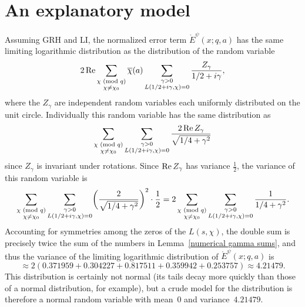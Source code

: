 \documentclass[11pt]{article}
\theoremstyle{plain}
\theoremstyle{definition}
\numberwithin{equation}{section}
\renewcommand{\mod}[1]{{\ifmmode\text{\rm\ (mod~$#1$)}\else\discretionary{}{}{\hbox{\!\!}}\rm(mod~$#1$)\fi}}
\renewcommand{\Re}{\mathop{\rm Re}}
\renewcommand{\bar}{\overline}
\newcommand{\Edot}{\mathord{\mathring E}}
\newcommand{\0}{{\vec 0}}
\begin{document}
\section{An explanatory model}\label{model section}

Assuming GRH and LI, the normalized error term $\Edot^\psi(x;q,a)$ has the same limiting logarithmic distribution as the distribution of the random variable
\[
2\Re \sum_{\substack{\chi\mod{q}\\\chi\neq \chi_0}} \bar{\chi}(a) \sum_{\substack{\gamma>0 \\  L(1/2+i\gamma,\chi)=0}} \frac{Z_\gamma}{1/2+i\gamma},
\]
where the $Z_\gamma$ are independent random variables each uniformly distributed on the unit circle. Individually this random variable has the same distribution as
\[
\sum_{\substack{\chi\mod{q}\\\chi\neq \chi_0}} \sum_{\substack{\gamma>0 \\  L(1/2+i\gamma,\chi)=0}} \frac{2\Re Z_\gamma}{\sqrt{1/4+\gamma^2}}
\]
since $Z_\gamma$ is invariant under rotations. Since $\Re Z_\gamma$ has variance $\frac12$, the variance of this random variable is
\[
\sum_{\substack{\chi\mod{q}\\\chi\neq \chi_0}} \sum_{\substack{\gamma>0 \\  L(1/2+i\gamma,\chi)=0}} \biggl( \frac{2}{\sqrt{1/4+\gamma^2}} \biggr)^2 \cdot \frac12 = 2 \sum_{\substack{\chi\mod{q}\\\chi\neq \chi_0}} \sum_{\substack{\gamma>0 \\  L(1/2+i\gamma,\chi)=0}} \frac1{1/4+\gamma^2}.
\]
Accounting for symmetries among the zeros of the $L(s,\chi)$, the double sum is precisely twice the sum of the numbers in Lemma~\ref{numerical gamma sums}, and thus the variance of the limiting logarithmic distribution of $\Edot^\psi(x;q,a)$ is
\[
\approx 2(0.371959 + 0.304227 + 0.817511 + 0.359942 + 0.253757) \approx 4.21479.
\]
This distribution is certainly not normal (its tails decay more quickly than those of a normal distribution, for example), but a crude model for the distribution is therefore a normal random variable with mean~$0$ and variance~$4.21479$.
\end{document}
